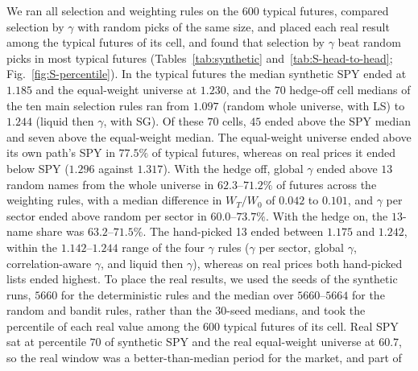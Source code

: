 We ran all selection and weighting rules on the $600$ typical futures, compared selection by $\gamma$ with random
picks of the same size, and placed each real result among the typical futures of its cell, and found that selection
by $\gamma$ beat random picks in most typical futures (Tables~\ref{tab:synthetic} and~\ref{tab:S-head-to-head};
Fig.~\ref{fig:S-percentile}). In the typical futures the median synthetic SPY ended at $1.185$ and the equal-weight
universe at $1.230$, and the $70$ hedge-off cell medians of the ten main selection rules ran from $1.097$ (random
whole universe, with LS) to $1.244$ (liquid then $\gamma$, with SG).
Of these $70$ cells, $45$ ended above the SPY median and seven above the equal-weight median. The equal-weight
universe ended above its own path's SPY in $77.5\%$ of typical futures, whereas on real prices it ended below SPY
($1.296$ against $1.317$).
With the hedge off, global $\gamma$ ended above $13$ random names from the whole universe in $62.3$--$71.2\%$ of
futures across the weighting rules, with a median difference in $W_T/W_0$ of $0.042$ to $0.101$, and $\gamma$ per
sector ended above random per sector in $60.0$--$73.7\%$. With the hedge on, the $13$-name share was
$63.2$--$71.5\%$.
The hand-picked 13 ended between $1.175$ and $1.242$, within the $1.142$--$1.244$ range of the four $\gamma$ rules
($\gamma$ per sector, global $\gamma$, correlation-aware $\gamma$, and liquid then $\gamma$), whereas on real prices
both hand-picked lists ended highest.
To place the real results, we used the seeds of the synthetic runs, $5660$ for the deterministic rules and the median
over $5660$--$5664$ for the random and bandit rules, rather than the $30$-seed medians, and took the percentile of
each real value among the $600$ typical futures of its cell. Real SPY sat at percentile $70$ of synthetic SPY and the
real equal-weight universe at $60.7$, so the real window was a better-than-median period for the market, and part of
